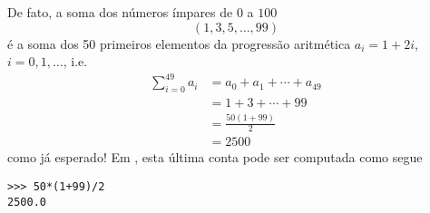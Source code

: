 De fato, a soma dos números ímpares de $0$ a $100$
\begin{equation}
  (1, 3, 5, \dotsc, 99)
\end{equation}
é a soma dos 50 primeiros elementos da progressão aritmética $a_i = 1 + 2i$, $i=0, 1, \ldots$, i.e.
\begin{align}
  \sum_{i=0}^{49}a_i &= a_0 + a_1 + \cdots + a_{49}\\
                     &= 1 + 3 + \cdots + 99\\
                     &= \frac{50(1 + 99)}{2}\\
                     &= 2500
\end{align}
como já esperado! Em {\python}, esta última conta pode ser computada como segue

\begin{lstlisting}
>>> 50*(1+99)/2
2500.0
\end{lstlisting}
